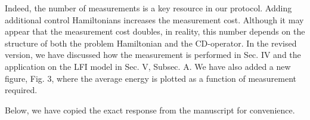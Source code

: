\documentclass[groupedaddress,prx,floats,superscriptaddress,notitlepages,12pt]{revtex4-2}
\begin{document}



Indeed, the number of measurements is a key resource in our protocol. Adding additional control Hamiltonians increases the measurement cost. Although it may appear that the measurement cost doubles, in reality, this number depends on the structure of both the problem Hamiltonian and the CD-operator. In the revised version, we have discussed how the measurement is performed in Sec. IV and the application on the LFI model in Sec. V, Subsec. A. We have also added a new figure, Fig. 3, where the average energy is plotted as a function of measurement required. 


Below, we have copied the exact response from the manuscript for convenience.
\end{document}

